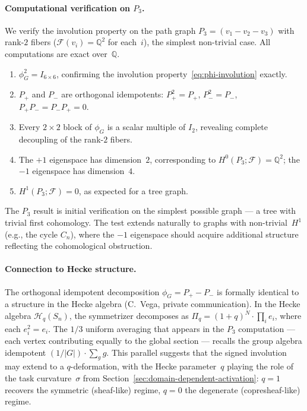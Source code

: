 \paragraph{Computational verification on $P_3$.}
We verify the involution property on the path graph
$P_3 = (v_1 - v_2 - v_3)$ with rank-$2$ fibers
($\mathcal{F}(v_i) = \mathbb{Q}^2$ for each~$i$), the simplest
non-trivial case.  All computations are exact over~$\mathbb{Q}$.
\begin{enumerate}
\item $\phi_G^2 = I_{6 \times 6}$, confirming the involution
  property~\eqref{eq:phi-involution} exactly.
\item $P_+$ and $P_-$ are orthogonal idempotents:
  $P_+^2 = P_+$, $P_-^2 = P_-$, $P_+ P_- = P_- P_+ = 0$.
\item Every $2 \times 2$ block of $\phi_G$ is a scalar multiple of
  $I_2$, revealing complete decoupling of the rank-$2$ fibers.
\item The $+1$ eigenspace has dimension~$2$, corresponding to
  $H^0(P_3;\mathcal{F}) = \mathbb{Q}^2$; the $-1$ eigenspace has
  dimension~$4$.
\item $H^1(P_3;\mathcal{F}) = 0$, as expected for a tree graph.
\end{enumerate}
The $P_3$ result is initial verification on the simplest possible
graph --- a tree with trivial first cohomology.  The test extends
naturally to graphs with non-trivial~$H^1$ (e.g., the cycle $C_n$),
where the $-1$ eigenspace should acquire additional structure reflecting
the cohomological obstruction.

\paragraph{Connection to Hecke structure.}
The orthogonal idempotent decomposition $\phi_G = P_+ - P_-$ is
formally identical to a structure in the Hecke algebra
(C.~Vega, private communication).  In the Hecke algebra
$\mathcal{H}_q(S_n)$, the symmetrizer decomposes as
$\Pi_q = (1+q)^N \cdot \prod_i e_i$, where each $e_i^2 = e_i$.
The $1/3$ uniform averaging that appears in the $P_3$ computation
--- each vertex contributing equally to the global section ---
recalls the group algebra idempotent $(1/|G|) \cdot \sum_g g$.
This parallel suggests that the signed involution may extend to a
$q$-deformation, with the Hecke parameter~$q$ playing the role of
the task curvature~$\sigma$ from Section~\ref{sec:domain-dependent-activation}:
$q = 1$ recovers the symmetric (sheaf-like) regime, $q = 0$
the degenerate (copresheaf-like) regime.

